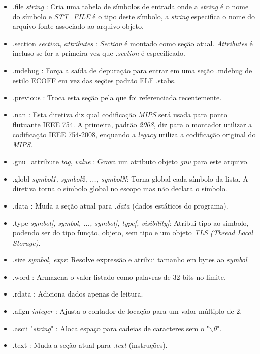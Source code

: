 \documentclass[12pt]{article}
\begin{document}
\begin{itemize}
	
\item .file \textit{string} : Cria uma tabela de símbolos de entrada onde a \textit{string} é o nome do símbolo e \textit{STT\_FILE} é o tipo deste símbolo, a \textit{string} especifica o nome do arquivo fonte associado ao arquivo objeto.
\item .section \textit{section}, \textit{attributes} : \textit{Section} é montado como seção atual. \textit{Attributes} é incluso se for a primeira vez que \textit{.section} é especificado.
\item .mdebug : Força a saída de depuração para entrar em uma seção .mdebug de estilo ECOFF em vez das seções padrão ELF .stabs.
\item .previous : Troca esta seção pela que foi referenciada recentemente.
\item .nan : Esta diretiva diz qual codificação \textit{MIPS} será usada para ponto flutuante IEEE 754. A primeira, padrão \textit{2008}, diz para o montador utilizar a codificação IEEE 754-2008, enquando a \textit{legacy} utiliza a codificação original do \textit{MIPS}.
\item .gnu\_attribute \textit{tag}, \textit{value} : Grava um atributo objeto \textit{gnu} para este arquivo.
\item .globl \textit{symbol1, symbol2, ..., symbolN}: Torna global cada símbolo da lista. A diretiva torna o símbolo global no escopo mas não declara o símbolo.
\item .data : Muda a seção atual para \textit{.data} (dados estáticos do programa).
\item .type \textit{symbol[, symbol, ..., symbol], type[, visibility]}: Atribui tipo ao símbolo, podendo ser do tipo função, objeto, sem tipo e um objeto \textit{TLS (Thread Local Storage)}.
\item .size \textit{symbol, expr}: Resolve expressão e atribui tamanho em bytes ao \textit{symbol}.
\item .word : Armazena o valor listado como palavras de 32 bits no limite.
\item .rdata : Adiciona dados apenas de leitura.
\item .align \textit{integer} : Ajusta o contador de locação para um valor múltiplo de 2.
\item .ascii "\textit{string}" : Aloca espaço para cadeias de caracteres sem o "\textit{$\backslash$0}".
\item .text : Muda a seção atual para \textit{.text} (instruções).

\end{itemize}
\end{document}
